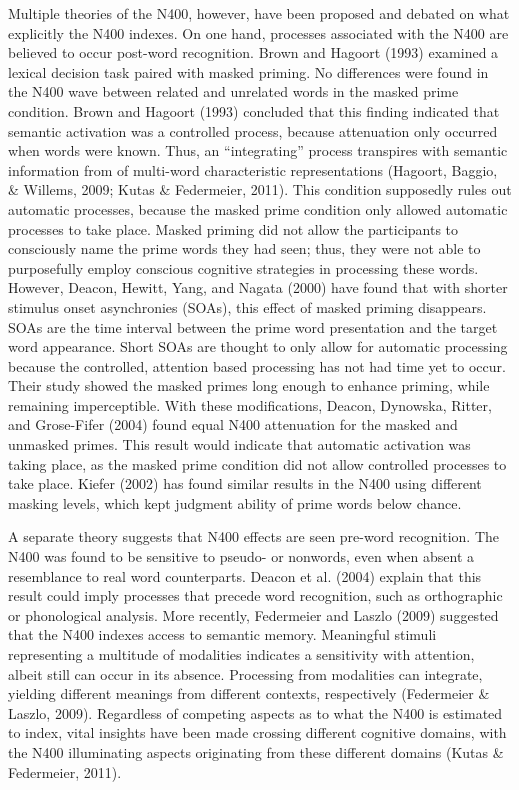 \documentclass[english,man]{apa6}
\theoremstyle{definition}
\theoremstyle{definition}
\theoremstyle{definition}
\theoremstyle{remark}
\begin{document}
Multiple theories of the N400, however, have been proposed and debated
on what explicitly the N400 indexes. On one hand, processes associated
with the N400 are believed to occur post-word recognition. Brown and
Hagoort (1993) examined a lexical decision task paired with masked
priming. No differences were found in the N400 wave between related and
unrelated words in the masked prime condition. Brown and Hagoort (1993)
concluded that this finding indicated that semantic activation was a
controlled process, because attenuation only occurred when words were
known. Thus, an \enquote{integrating} process transpires with semantic
information from of multi-word characteristic representations (Hagoort,
Baggio, \& Willems, 2009; Kutas \& Federmeier, 2011). This condition
supposedly rules out automatic processes, because the masked prime
condition only allowed automatic processes to take place. Masked priming
did not allow the participants to consciously name the prime words they
had seen; thus, they were not able to purposefully employ conscious
cognitive strategies in processing these words. However, Deacon, Hewitt,
Yang, and Nagata (2000) have found that with shorter stimulus onset
asynchronies (SOAs), this effect of masked priming disappears. SOAs are
the time interval between the prime word presentation and the target
word appearance. Short SOAs are thought to only allow for automatic
processing because the controlled, attention based processing has not
had time yet to occur. Their study showed the masked primes long enough
to enhance priming, while remaining imperceptible. With these
modifications, Deacon, Dynowska, Ritter, and Grose-Fifer (2004) found
equal N400 attenuation for the masked and unmasked primes. This result
would indicate that automatic activation was taking place, as the masked
prime condition did not allow controlled processes to take place. Kiefer
(2002) has found similar results in the N400 using different masking
levels, which kept judgment ability of prime words below chance.

A separate theory suggests that N400 effects are seen pre-word
recognition. The N400 was found to be sensitive to pseudo- or nonwords,
even when absent a resemblance to real word counterparts. Deacon et al.
(2004) explain that this result could imply processes that precede word
recognition, such as orthographic or phonological analysis. More
recently, Federmeier and Laszlo (2009) suggested that the N400 indexes
access to semantic memory. Meaningful stimuli representing a multitude
of modalities indicates a sensitivity with attention, albeit still can
occur in its absence. Processing from modalities can integrate, yielding
different meanings from different contexts, respectively (Federmeier \&
Laszlo, 2009). Regardless of competing aspects as to what the N400 is
estimated to index, vital insights have been made crossing different
cognitive domains, with the N400 illuminating aspects originating from
these different domains (Kutas \& Federmeier, 2011).
\end{document}
